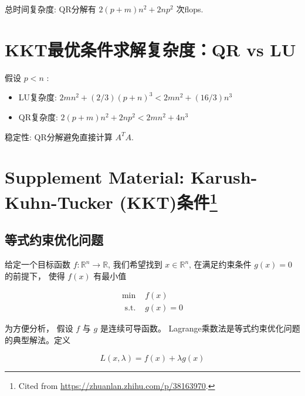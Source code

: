 总时间复杂度: QR分解有 $ 2(p+m) n^{2}+2 n p^{2} $ 次flops.


\section{KKT最优条件求解复杂度：QR vs LU}

假设 $ p<n $ :

\begin{itemize}
    \item LU复杂度: $ 2 m n^{2}+(2 / 3)(p+n)^{3}<2 m n^{2}+(16 / 3) n^{3} $
    \item QR复杂度: $ 2(p+m) n^{2}+2 n p^{2}<2 m n^{2}+4 n^{3} $
\end{itemize}

稳定性: QR分解避免直接计算 $ A^{T} {A}$.

\section[Supplement Material: Karush-Kuhn-Tucker (KKT)条件]{Supplement Material: Karush-Kuhn-Tucker (KKT)条件\footnote{Cited from \url{https://zhuanlan.zhihu.com/p/38163970}.}}

\subsection{等式约束优化问题}

\begin{problem}[等式约束优化问题]
    给定一个目标函数 $ f: \mathbb{R}^{n} \rightarrow \mathbb{R} $, 我们希望找到 $ {x} \in \mathbb{R}^{n} $, 在满足约束条件 $ g({x})=0 $ 的前提下， 使得 $ f({x}) $ 有最小值

    \begin{equation}
\begin{array}{ll}
\min & f({x}) \\
\text { s.t. } & g({x})=0
\end{array}
\end{equation}
\end{problem}

为方便分析， 假设 $ f $ 与 $ g $ 是连续可导函数。 Lagrange乘数法是等式约束优化问题的典型解法。定义

\begin{definition}[Lagrangian函数]
    \begin{equation}
L({x}, \lambda)=f({x})+\lambda g({x})
\end{equation}
\end{definition}

